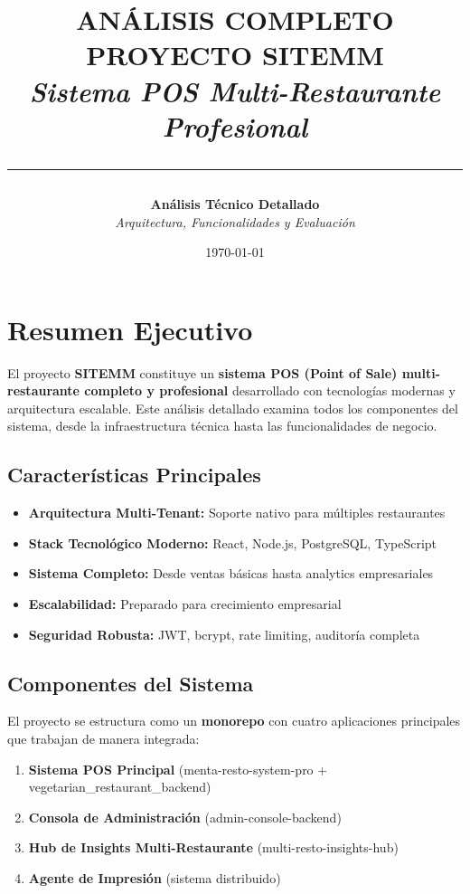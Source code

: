 \documentclass[12pt,a4paper]{article}
\title{
    \vspace{-2cm}
    {\Huge \textbf{\textcolor{primaryblue}{ANÁLISIS COMPLETO}}}\\
    \vspace{0.5cm}
    {\Large \textbf{\textcolor{secondarygreen}{PROYECTO SITEMM}}}\\
    \vspace{0.3cm}
    {\large \textit{Sistema POS Multi-Restaurante Profesional}}\\
    \vspace{1cm}
    \rule{\textwidth}{2pt}
}
\author{
    \textbf{Análisis Técnico Detallado}\\
    \textit{Arquitectura, Funcionalidades y Evaluación}
}
\date{\today}
\begin{document}
\maketitle
\thispagestyle{empty}

\newpage

\tableofcontents
\thispagestyle{empty}

\newpage

\section{Resumen Ejecutivo}

El proyecto \textbf{SITEMM} constituye un \textcolor{primaryblue}{\textbf{sistema POS (Point of Sale) multi-restaurante completo y profesional}} desarrollado con tecnologías modernas y arquitectura escalable. Este análisis detallado examina todos los componentes del sistema, desde la infraestructura técnica hasta las funcionalidades de negocio.

\subsection{Características Principales}

\begin{itemize}[leftmargin=*]
    \item \textcolor{secondarygreen}{\textbf{Arquitectura Multi-Tenant:}} Soporte nativo para múltiples restaurantes
    \item \textcolor{secondarygreen}{\textbf{Stack Tecnológico Moderno:}} React, Node.js, PostgreSQL, TypeScript
    \item \textcolor{secondarygreen}{\textbf{Sistema Completo:}} Desde ventas básicas hasta analytics empresariales
    \item \textcolor{secondarygreen}{\textbf{Escalabilidad:}} Preparado para crecimiento empresarial
    \item \textcolor{secondarygreen}{\textbf{Seguridad Robusta:}} JWT, bcrypt, rate limiting, auditoría completa
\end{itemize}

\subsection{Componentes del Sistema}

El proyecto se estructura como un \textbf{monorepo} con cuatro aplicaciones principales que trabajan de manera integrada:

\begin{enumerate}
    \item \textbf{Sistema POS Principal} (menta-resto-system-pro + vegetarian\_restaurant\_backend)
    \item \textbf{Consola de Administración} (admin-console-backend)
    \item \textbf{Hub de Insights Multi-Restaurante} (multi-resto-insights-hub)
    \item \textbf{Agente de Impresión} (sistema distribuido)
\end{enumerate}
\end{document}
